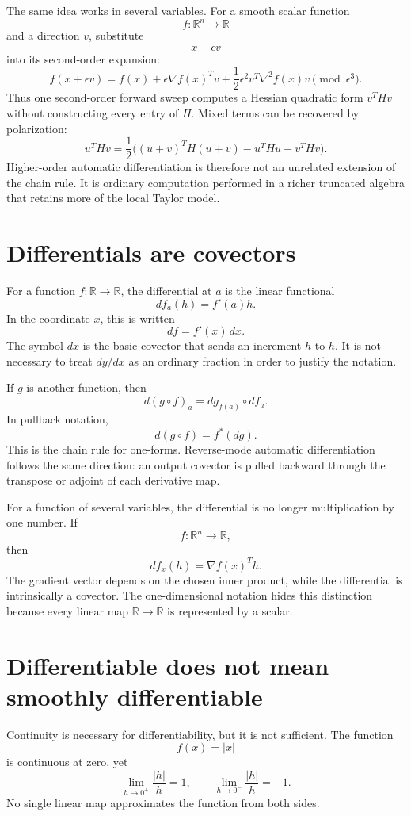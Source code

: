 The same idea works in several variables.  For a smooth scalar function
\[
  f:\mathbb R^n\to\mathbb R
\]
and a direction \(v\), substitute
\[
  x+\epsilon v
\]
into its second-order expansion:
\[
  f(x+\epsilon v)
  =f(x)
  +\epsilon\nabla f(x)^Tv
  +\frac12\epsilon^2v^T\nabla^2f(x)v
  \pmod{\epsilon^3}.
\]
Thus one second-order forward sweep computes a Hessian quadratic form \(v^THv\) without constructing every entry of \(H\).  Mixed terms can be recovered by polarization:
\[
  u^THv
  =\frac12\bigl((u+v)^TH(u+v)-u^THu-v^THv\bigr).
\]
Higher-order automatic differentiation is therefore not an unrelated extension of the chain rule.  It is ordinary computation performed in a richer truncated algebra that retains more of the local Taylor model.

\section{Differentials are covectors}

For a function \(f:\mathbb R\to\mathbb R\), the differential at \(a\) is the linear functional
\[
  df_a(h)=f'(a)h.
\]
In the coordinate \(x\), this is written
\[
  df=f'(x)\,dx.
\]
The symbol \(dx\) is the basic covector that sends an increment \(h\) to \(h\).  It is not necessary to treat \(dy/dx\) as an ordinary fraction in order to justify the notation.

If \(g\) is another function, then
\[
  d(g\circ f)_a
  =dg_{f(a)}\circ df_a.
\]
In pullback notation,
\[
  d(g\circ f)=f^*(dg).
\]
This is the chain rule for one-forms.  Reverse-mode automatic differentiation follows the same direction: an output covector is pulled backward through the transpose or adjoint of each derivative map.

For a function of several variables, the differential is no longer multiplication by one number.  If
\[
  f:\mathbb R^n\to\mathbb R,
\]
then
\[
  df_x(h)=\nabla f(x)^Th.
\]
The gradient vector depends on the chosen inner product, while the differential is intrinsically a covector.  The one-dimensional notation hides this distinction because every linear map \(\mathbb R\to\mathbb R\) is represented by a scalar.

\section{Differentiable does not mean smoothly differentiable}

Continuity is necessary for differentiability, but it is not sufficient.  The function
\[
  f(x)=|x|
\]
is continuous at zero, yet
\[
  \lim_{h\to0^+}\frac{|h|}{h}=1,
  \qquad
  \lim_{h\to0^-}\frac{|h|}{h}=-1.
\]
No single linear map approximates the function from both sides.

